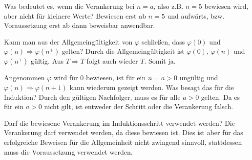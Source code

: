 \begin{card}
	Was bedeutet es, wenn die Verankerung bei $n=a$, also z.B. $n=5$ bewiesen wird, aber nicht für kleinere Werte?
	\hr
	Bewiesen erst ab $n=5$ und aufwärts, bzw. Voraussetzung erst ab dann beweisbar anwendbar.
\end{card}

\begin{card}
	Kann man aus der Allgemeingültigkeit von $\varphi$ schließen, dass $\varphi (0)$ und $\varphi (n)\Rightarrow \varphi (n^+)$ gelten?
	\hr
  Durch die Allgemeingültigkeit ist $\varphi(0)$, $\varphi(n)$ und $\varphi(n^+)$ gültig. Aus $T \Rightarrow T$ folgt auch wieder $T$. Somit ja.
\end{card}

\begin{card}
	Angenommen $\varphi$ wird für 0 bewiesen, ist für ein $n= a > 0$ ungültig und $\varphi(n) \Rightarrow \varphi(n+1)$ kann wiederum gezeigt werden. Was besagt das für die Induktion?
	\hr
	Durch den gültigen Nachfolger, muss es für alle $a > 0$ gelten. Da es für ein $a > 0$ nicht gilt, ist entweder der
	Schritt oder die Verankerung falsch.
\end{card}

\begin{card}
	Darf die bewiesene Verankerung im Induktionsschritt verwendet werden?
	\hr
  Die Verankerung darf verwendet werden, da diese bewiesen ist. Dies ist aber für das erfolgreiche Beweisen für
  die Allgemeinheit nicht zwingend sinnvoll, stattdessen muss die Voraussetzung verwendet werden.
\end{card}

